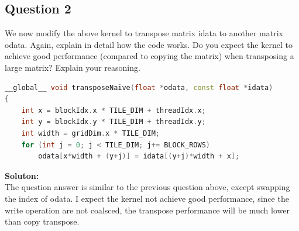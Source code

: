 \documentclass{article}
\begin{document}
\subsection{Question 2}
We now modify the above kernel to transpose matrix idata to another matrix odata. Again, explain in detail how the code works. Do you expect the kernel to achieve good performance (compared to copying the matrix) when transposing a large matrix? Explain your reasoning. 
\begin{lstlisting}[language=c++]
__global__ void transposeNaive(float *odata, const float *idata)
{
    int x = blockIdx.x * TILE_DIM + threadIdx.x;
    int y = blockIdx.y * TILE_DIM + threadIdx.y;
    int width = gridDim.x * TILE_DIM;
    for (int j = 0; j < TILE_DIM; j+= BLOCK_ROWS)
        odata[x*width + (y+j)] = idata[(y+j)*width + x];
\end{lstlisting}
\textbf{Soluton: }\\
The question answer is similar to the previous question above, except swapping the index of odata. I expect the kernel not achieve good performance, since the write operation are not coalsced, the transpose performance will be much lower than copy transpose.
\end{document}
